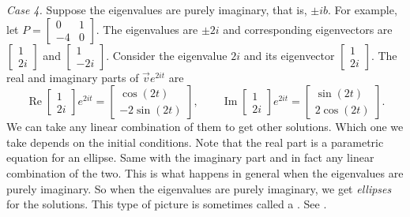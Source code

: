 \medskip

\pagebreak[0]
\emph{Case 4.} Suppose the eigenvalues are purely imaginary, that is,
$\pm ib$.  For example,
let $P = 
\left[ \begin{smallmatrix} 0 & 1 \\ -4 & 0 \end{smallmatrix} \right]$.
The eigenvalues are $\pm 2i$ and corresponding eigenvectors are
$\left[ \begin{smallmatrix} 1 \\ 2i \end{smallmatrix} \right]$ and
$\left[ \begin{smallmatrix} 1 \\ -2i \end{smallmatrix} \right]$.  Consider
the eigenvalue $2i$ and its eigenvector
$\left[ \begin{smallmatrix} 1 \\ 2i \end{smallmatrix} \right]$.
The real and imaginary
parts of $\vec{v} e^{2it}$ are
\begin{equation*}
\operatorname{Re}
\begin{bmatrix} 1 \\ 2i \end{bmatrix} e^{2it} =
\begin{bmatrix} \cos (2t) \\ -2 \sin (2t)  \end{bmatrix} ,
\qquad
\operatorname{Im}
\begin{bmatrix} 1 \\ 2i \end{bmatrix} e^{2it} =
\begin{bmatrix} \sin (2t) \\ 2 \cos (2t) \end{bmatrix} .
\end{equation*}
We can take any linear combination of them to get other solutions.
Which one we take
depends on the initial
conditions.  Note that the real part is
a parametric equation for an ellipse.  Same with the imaginary part
and in fact any linear combination of the two.
This is what happens in general when the eigenvalues are purely imaginary.
So when the eigenvalues are purely imaginary, we get
\emph{ellipses} for the
solutions.  This type of picture is sometimes called a
\emph{}.  See .


